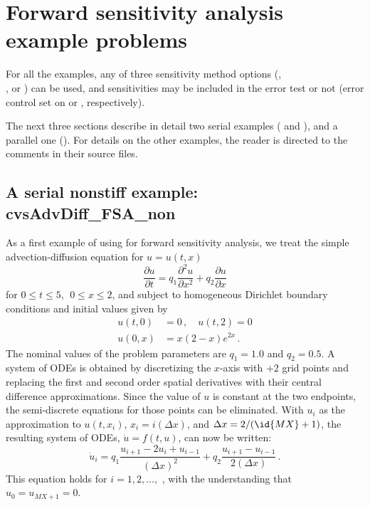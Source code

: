 \section{Forward sensitivity analysis example problems}\label{s:fwd_ex}

For all the {\cvodes} examples, any of three sensitivity method options
(, \\
, or ) can be used, and sensitivities may be 
included in the error test or not (error control set on  or ,
respectively).

The next three sections describe in detail two serial examples
( and ), 
and a parallel one ().
For details on the other examples, the reader is directed to the comments in
their source files.

\subsection{A serial nonstiff example: cvsAdvDiff\_FSA\_non}
\label{ss:cvsAdvDiff_FSA_non}

As a first example of using {\cvodes} for forward sensitivity analysis,
we treat the simple advection-diffusion equation
for $u=u(t,x)$
\begin{equation}\label{e:cvsAdvDiff_FSA_non_PDE}
  \frac{\partial u}{\partial t}= q_1 \frac{\partial ^{2}u}{\partial x^{2}}
  + q_2 \frac{\partial u}{\partial x}
\end{equation}
for $0 \leq t \leq 5, ~~ 0\leq x \leq 2$, and subject to homogeneous
Dirichlet boundary conditions and initial values given by 
\begin{equation}\label{e:cvsAdvDiff_FSA_non_BC_IC}
  \begin{split}
    u(t,0) &= 0 \, , \quad u(t,2) = 0 \\
    u(0,x) &= x(2-x)e^{2x} \, .
  \end{split}
\end{equation}
The nominal values of the problem parameters are $q_1 = 1.0$ and $q_2 = 0.5$.
A system of  ODEs is obtained by discretizing the $x$-axis with +2
grid points and replacing the first and second order spatial derivatives
with their central difference approximations. Since the value of $u$ is
constant at the two endpoints, the semi-discrete equations for those points
can be eliminated.  With $u_{i}$ as the approximation to $u(t,x_{i})$, 
$x_{i} = i(\Delta x)$, and $\Delta x=2/(\id{MX}+1)$, the resulting system of
ODEs, ${\dot u} = f(t,u)$, can now be written:
\begin{equation}\label{e:cvsAdvDiff_FSA_non_ODE}
  {\dot u}_i= q_1 \frac{u_{i+1}-2u_{i}+u_{i-1}}{(\Delta x)^{2}}
  + q_2 \frac{u_{i+1}-u_{i-1}}{2(\Delta x)} \, .
\end{equation}
This equation holds for $i=1,2,\ldots ,$ , with the understanding
that $u_{0} = u_{MX+1}=0.$

